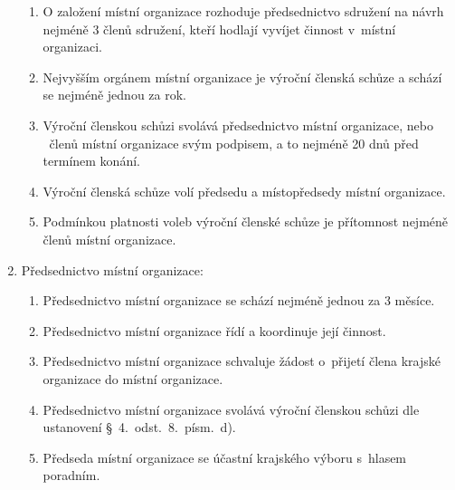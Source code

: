 \documentclass[a4paper]{article}
\begin{document}
\begin{enumerate}
\begin{enumerate}
        \item O založení místní organizace rozhoduje předsednictvo sdružení na
            návrh nejméně 3 členů sdružení, kteří hodlají vyvíjet činnost
            v~místní organizaci.

        \item Nejvyšším orgánem místní organizace je výroční členská schůze a
            schází se nejméně jednou za rok.

        \item Výroční členskou schůzi svolává předsednictvo místní organizace,
            nebo ~členů místní organizace svým podpisem, a to
            nejméně 20 dnů před termínem konání.

        \item Výroční členská schůze volí předsedu a místopředsedy místní
            organizace.

        \item Podmínkou platnosti voleb výroční členské schůze
            je přítomnost nejméně  členů místní organizace.
        \end{enumerate}

    \item Předsednictvo místní organizace:
        \begin{enumerate}
        \item Předsednictvo místní organizace se schází nejméně jednou za
            3 měsíce.

        \item Předsednictvo místní organizace řídí a koordinuje její činnost.

        \item Předsednictvo místní organizace schvaluje žádost o~přijetí
            člena krajské organizace do místní organizace.

        \item Předsednictvo místní organizace svolává výroční členskou
            schůzi dle ustanovení \S~4.~odst.~8.~písm.~d).

        \item Předseda místní organizace se účastní krajského výboru
            s~hlasem poradním.
        \end{enumerate}
    \end{enumerate}
\end{document}
